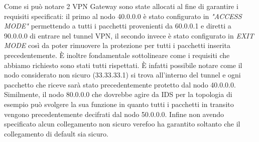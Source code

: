 Come si può notare 2 VPN Gateway sono state allocati al fine di garantire i requisiti specificati: il primo al nodo 40.0.0.0
è stato configurato in \textit{"ACCESS MODE"} permettendo a tutti i pacchetti provenienti da 60.0.0.1 e diretti a 90.0.0.0 di entrare nel tunnel VPN, il
secondo invece è stato configurato in \textit{EXIT MODE} così da poter rimuovere la protezione per tutti i pacchetti inserita precedentemente. È inoltre fondamentale
sottolineare come i requisiti che abbiamo richiesto sono stati tutti rispettati. È infatti possibile notare come il nodo considerato non sicuro (33.33.33.1) si trova all'interno del tunnel e ogni
pacchetto che riceve sarà stato precedentemente protetto dal nodo 40.0.0.0. Similmente, il nodo 80.0.0.0 che dovrebbe agire da IDS per la topologia di esempio può svolgere la sua funzione in quanto
tutti i pacchetti in transito vengono precedentemente decifrati dal nodo 50.0.0.0. Infine non avendo specificato alcun collegamento non sicuro verefoo ha garantito soltanto che il collegamento di default
sia sicuro.

